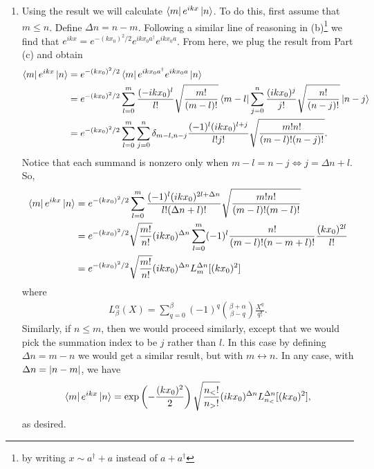 \documentclass{article}
\theoremstyle{definition}
\newcommand{\al}{\alpha}
\newcommand{\be}{\beta}
\newcommand{\f}[2]{\frac{#1}{#2}}
\newcommand{\lp}{\left(}
\newcommand{\rp}{\right)}
\begin{document}
\begin{enumerate}[label = (\alph*)]
	
	\item Using the result we will calculate $\bra{m} e^{ikx} \ket{n}$. To do this, first assume that $m \leq n$. Define $\Delta n = n-m$.  Following a similar line of reasoning in (b)\footnote{by writing $x\sim a^\dagger + a$ instead of $a+a^\dagger$} we find that $
	e^{ikx} = e^{-(kx_0)^2/2} e^{ikx_0 a^\dagger} e^{ikx_0 a}$. From here, we plug the result from Part (c) and obtain 
	\begin{align*}
	\bra{m} e^{ikx} \ket{n} 
	&= e^{-(kx_0)^2/2} \bra{m} e^{ikx_0 a^\dagger } e^{ikx_0 a}  \ket{n} \\
	&= e^{-(kx_0)^2/2} \sum_{l=0}^m \f{(-ikx_0)^l}{l!} \sqrt{\f{m!}{(m-l)!}} \bra{m-l} \sum_{j=0}^n \f{(ikx_0)^j}{j!} \sqrt{\f{n!}{(n-j)!}} \ket{n-j}\\
	&= e^{-(kx_0)^2/2} \sum^m_{l=0}\sum^n_{j=0} \delta_{m-l, n-j} \f{(-1)^l (ik x_0)^{l+j}}{l!j!} \sqrt{\f{m!n!}{(m-l)!(n-j)!}}. 
	\end{align*}
	Notice that each summand is nonzero only when $m-l = n-j \iff j = \Delta n + l$. So, 
	\begin{align*}
	\bra{m} e^{ikx} \ket{n}  
	&= e^{-(kx_0)^2/2}\sum^m_{l=0}\f{(-1)^l (ik x_0)^{2l + \Delta n}}{l!(\Delta n + l)!} \sqrt{\f{m!n!}{(m-l)!(m-l )!}} \\
	&= e^{-(kx_0)^2/2} \sqrt{\f{m!}{n!}} (ikx_0)^{\Delta n} \sum^m_{l=0} (-1)^l \f{n!}{(m-l)!(n-m + l)!} \f{(kx_0)^{2l}}{l!}\\
	&= e^{-(kx_0)^2/2} \sqrt{\f{m!}{n!}}(ikx_0)^{\Delta n} L^{\Delta n}_{m} [(kx_0)^2]
	\end{align*}
	where 
	\begin{align*}
	L^{\al}_\be(X) = \sum^{\be}_{q=0} (-1)^q {{\be + \al}\choose{\be - q}}\f{X^q}{q!}.
	\end{align*}
	Similarly, if $n \leq m$, then we would proceed similarly, except that we would pick the summation index to be $j$ rather than $l$. In this case by defining $\Delta n = m-n$ we would get a similar result, but with $m\leftrightarrow n$. In any case, with $\Delta n = \abs{n-m}$, we have 
	\begin{align*}
	\bra{m} e^{ikx}\ket{n} = \exp\lp -\f{(kx_0)^2}{2} \rp  \sqrt{\f{n_<!}{n_>!}} (ikx_0)^{\Delta n} L_{n_<}^{\Delta n}[(kx_0)^2],
	\end{align*}
	as desired. 
	

\end{enumerate}
\end{document}
